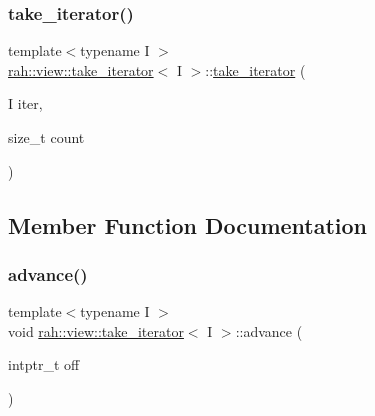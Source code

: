 \subsubsection{\texorpdfstring{take\_iterator()}{take\_iterator()}\hspace{0.1cm}{\footnotesize\ttfamily [2/2]}}
{\footnotesize\ttfamily template$<$typename I $>$ \\
\mbox{\hyperlink{structrah_1_1view_1_1take__iterator}{rah\+::view\+::take\+\_\+iterator}}$<$ I $>$\+::\mbox{\hyperlink{structrah_1_1view_1_1take__iterator}{take\+\_\+iterator}} (\begin{DoxyParamCaption}\item[{I}]{iter,  }\item[{size\+\_\+t}]{count }\end{DoxyParamCaption})\hspace{0.3cm}{\ttfamily [inline]}}



\subsection{Member Function Documentation}
\mbox{\label{structrah_1_1view_1_1take__iterator_a55e1c95489b33de8006af33b9511fb28}} 
\subsubsection{\texorpdfstring{advance()}{advance()}}
{\footnotesize\ttfamily template$<$typename I $>$ \\
void \mbox{\hyperlink{structrah_1_1view_1_1take__iterator}{rah\+::view\+::take\+\_\+iterator}}$<$ I $>$\+::advance (\begin{DoxyParamCaption}\item[{intptr\+\_\+t}]{off }\end{DoxyParamCaption})\hspace{0.3cm}{\ttfamily [inline]}}

\mbox{\label{structrah_1_1view_1_1take__iterator_a8f956fdfee282abbd88100533033d648}} 
